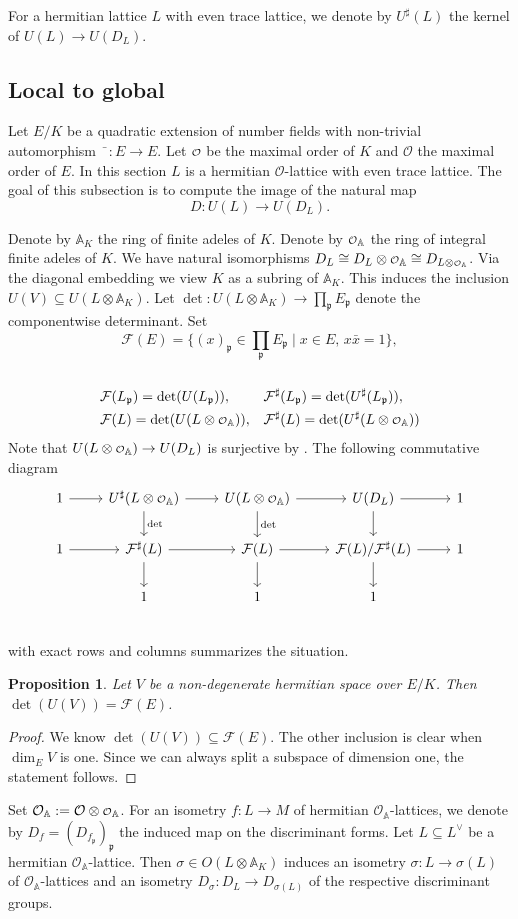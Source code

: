 \documentclass[a4paper]{amsart}
\theoremstyle{definition}
\theoremstyle{plain}
\newtheorem{proposition}[definition]{Proposition}
\renewcommand{\AA}{\mathbb{A}}
\renewcommand{\O}{\mathcal{O}}
\newcommand{\F}{\mathcal{F}}
\newcommand{\fp}{\mathfrak{p}}
\renewcommand\o{
  \mathchoice
    {{\scriptstyle\mathcal{O}}}%
    {{\scriptstyle\mathcal{O}}}%
    {{\scriptscriptstyle\mathcal{O}}}%
    {\scalebox{.7}{$\scriptscriptstyle\mathcal{O}$}}%
  }
\newcommand{\disc}[1]{{D_{#1}}}
\begin{document}
For a hermitian lattice $L$ with even trace lattice, we denote by $U^\sharp(L)$ the kernel of $U(L) \to U(\disc{L})$.

\subsection{Local to global}
Let $E/K$ be a quadratic extension of number fields with non-trivial automorphism $\bar{\phantom{x}} \colon E \to E$.
Let $\o$ be the maximal order of $K$ and $\O$ the maximal order of $E$.
In this section $L$ is a hermitian $\O$-lattice with even trace lattice.
The goal of this subsection is to compute
the image of the natural map
\[D\colon U(L) \rightarrow U(\disc{L}).\]

%
%
%
%
%
%
Denote by $\AA_K$ the ring of finite adeles of $K$.
Denote by $\o_{\AA}$ the ring of integral finite adeles of $K$.
We have natural isomorphisms $\disc{L} \cong \disc{L} \otimes \o_{\AA} \cong \disc{L \otimes \o_{\AA}}$.
Via the diagonal embedding we view $K$ as a subring of $\AA_K$.
%
This induces the inclusion $U(V)\subseteq U(L \otimes \AA_K)$.
Let $\det \colon U(L \otimes \AA_K) \to \prod_\fp E_\fp$ denote the componentwise determinant.
Set
\[\F(E) = \{(x)_\fp \in \prod_{\fp} E_\fp \mid x \in E,\,  x \bar x = 1\},\]\\[-25pt]
\begin{align*}
&\F(L_\fp) = \det(U(L_\fp)), &&\F^\sharp(L_\fp)=\det(U^\sharp(L_\fp)), \\
&\F(L) =\det(U(L \otimes \o_{\AA})), & &\F^\sharp(L) = \det(U^\sharp(L\otimes \o_{\AA}))
\end{align*}
Note that $U(L \otimes \o_{\AA}) \to U(\disc{L})$ is surjective by .
The following commutative diagram
\[
\begin{tikzcd}
  1\arrow[r]& U^\sharp(L\otimes \o_{\AA}) \arrow[r]\arrow[d,"\det"] &U(L\otimes \o_{\AA}) \arrow[r]\arrow[d,"\det"]& U(\disc{L})\arrow[r]\arrow[d] & 1\\
1\arrow[r]& \F^\sharp(L)\arrow[d] \arrow[r] &\F(L)\arrow[d]\arrow[r] & \F(L)/\F^\sharp(L)\arrow[d]\arrow[r]&1\\
& 1   &1 &1\\
\end{tikzcd}\]
with exact rows and columns summarizes the situation.


\begin{proposition}\label{kernel:weak-approx}
Let $V$ be a non-degenerate hermitian space over $E/K$.
Then $\det(U(V))=\F(E)$.
\end{proposition}
\begin{proof}
 We know $\det(U(V))\subseteq \F(E)$. The other inclusion is clear when $\dim_E V$ is one.
 Since we can always split a subspace of dimension one, the statement follows.
\end{proof}
Set $\O_\AA:= \O \otimes \o_\AA$.
For an isometry $f\colon L \to M$ of hermitian $\O_{\AA}$-lattices, we denote by $D_f=(D_{f_\fp})_\fp$ the induced map on the discriminant forms.
Let $L \subseteq L^\vee$ be a hermitian $\O_{\AA}$-lattice. Then $\sigma \in O(L \otimes \AA_K)$ induces an isometry $\sigma \colon L \to \sigma(L)$ of $\O_{\AA}$-lattices and an isometry
$D_\sigma\colon \disc{L} \to \disc{\sigma(L)}$ of the respective discriminant groups.
\end{document}
